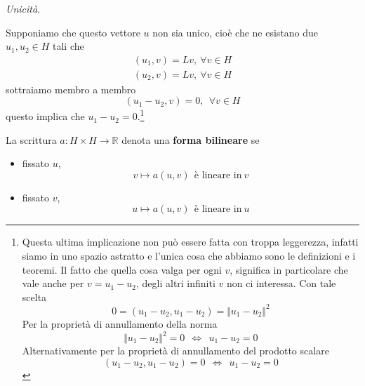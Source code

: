 \begin{dimostrazione}
    \textit{Unicità.}

    Supponiamo che questo vettore $u$ non sia unico, cioè che ne esistano due $u_{1},u_{2} \in H$ tali che
    \begin{gather*}
        (u_{1},v) =Lv,\ \forall v\in H\\
        (u_{2},v) =Lv,\ \forall v\in H
    \end{gather*}
    sottraiamo membro a membro
    \begin{equation*}
        (u_{1} -u_{2},v) =0,\ \ \forall v\in H
    \end{equation*}
    questo implica che $u_{1} -u_{2} =0$.\footnote{Questa ultima implicazione non può essere fatta con troppa leggerezza, infatti siamo in uno spazio astratto e l'unica cosa che abbiamo sono le definizioni e i teoremi. Il fatto che quella cosa valga per ogni $v$, significa in particolare che vale anche per $v=u_{1} -u_{2}$, degli altri infiniti $v$ non ci interessa. Con tale scelta
    \begin{equation*}
        0=(u_{1} -u_{2},u_{1} -u_{2}) =\Vert u_{1} -u_{2}\Vert ^{2}
    \end{equation*}
    Per la proprietà di annullamento della norma
    \begin{equation*}
        \Vert u_{1} -u_{2}\Vert ^{2} =0\ \ \Leftrightarrow \ \ u_{1} -u_{2} =0
    \end{equation*}
    Alternativamente per la proprietà di annullamento del prodotto scalare
    \begin{equation*}
        (u_{1} -u_{2},u_{1} -u_{2}) =0\ \ \Leftrightarrow \ \ u_{1} -u_{2} =0
    \end{equation*}}
\end{dimostrazione}
\begin{definition}
    La scrittura $a:H\times H\rightarrow \mathbb{R}$ denota una \textbf{forma bilineare} se
    \begin{itemize}
        \item fissato $u$,
              \begin{equation*}
                  v\mapsto a(u,v) \ \ \text{è lineare in} \ v
              \end{equation*}
        \item fissato $v$,
              \begin{equation*}
                  u\mapsto a(u,v) \ \ \text{è lineare in} \ u
              \end{equation*}
    \end{itemize}
\end{definition}
